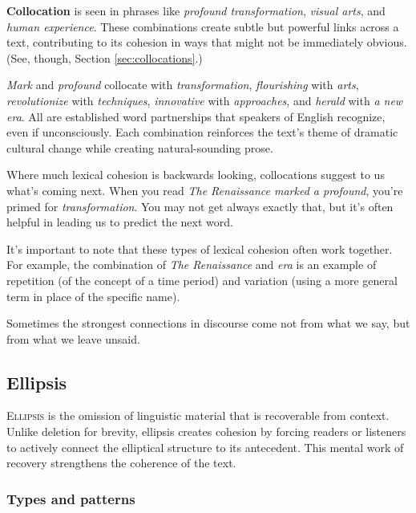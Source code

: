 \textbf{Collocation} is seen in phrases like \textit{profound transformation}, \textit{visual arts}, and \textit{human experience}. These combinations create subtle but powerful links across a text, contributing to its cohesion in ways that might not be immediately obvious. (See, though, Section \ref{sec:collocations}.)

\textit{Mark} and \textit{profound} collocate with \textit{ transformation}, \textit{flourishing }with\textit{ arts}, \textit{revolutionize }with\textit{ techniques}, \textit{innovative }with\textit{ approaches}, and \textit{herald }with \textit{a new era}. All are established word partnerships that speakers of English recognize, even if unconsciously. Each combination reinforces the text's theme of dramatic cultural change while creating natural-sounding prose.

Where much lexical cohesion is backwards looking, collocations suggest to us what's coming next. When you read \textit{The Renaissance marked a profound}, you're primed for \textit{transformation}. You may not get always exactly that, but it's often helpful in leading us to predict the next word.

\bigskip

It's important to note that these types of lexical cohesion often work together. For example, the combination of \textit{\textcolor{xGreen}{The Renaissance}} and \textit{\textcolor{xGreen}{era}} is an example of repetition (of the concept of a time period) and variation (using a more general term in place of the specific name).

Sometimes the strongest connections in discourse come not from what we say, but from what we leave unsaid.

\subsection{Ellipsis}\label{sec:ellipsis}

\textsc{Ellipsis} is the omission of linguistic material that is recoverable from context. Unlike deletion for brevity, ellipsis creates cohesion by forcing readers or listeners to actively connect the elliptical structure to its antecedent. This mental work of recovery strengthens the coherence of the text.

\subsubsection*{Types and patterns}

